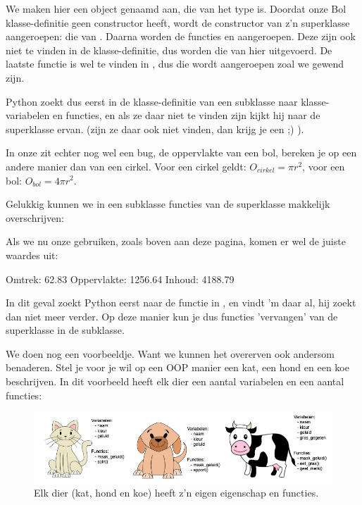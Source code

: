 We maken hier een object genaamd  aan, die van het type  is. Doordat onze Bol klasse-definitie geen constructor heeft, wordt de constructor van z'n superklasse aangeroepen: die van . Daarna worden de functies  en  aangeroepen. Deze zijn ook niet te vinden in de  klasse-definitie, dus worden die van  hier uitgevoerd. De laatste functie  is wel te vinden in , dus die wordt aangeroepen zoal we gewend zijn. \newline

Python zoekt dus eerst in de klasse-definitie van een subklasse naar klasse-variabelen en functies, en als ze daar niet te vinden zijn kijkt hij naar de superklasse ervan. (zijn ze daar ook niet vinden, dan krijg je een  ;) ). \newline

In onze  zit echter nog wel een bug, de oppervlakte van een bol, bereken je op een andere manier dan van een cirkel. Voor een cirkel geldt: $O_{cirkel} = \pi r^2$, voor een bol: $O_{bol} = 4\pi r^2$. \newline

Gelukkig kunnen we in een subklasse functies van de superklasse makkelijk overschrijven:

Als we nu onze  gebruiken, zoals boven aan deze pagina, komen er wel de juiste waardes uit:
\begin{python}
Omtrek: 62.83
Oppervlakte: 1256.64
Inhoud: 4188.79
\end{python}

In dit geval zoekt Python eerst naar de functie  in , en vindt 'm daar al, hij zoekt dan niet meer verder. Op deze manier kun je dus functies 'vervangen' van de superklasse in de subklasse. \newline \newline

We doen nog een voorbeeldje. Want we kunnen het overerven ook andersom benaderen. Stel je voor je wil op een OOP manier een kat, een hond en een koe beschrijven. In dit voorbeeld heeft elk dier een aantal variabelen en een aantal functies: 

\begin{figure}[h!]
\centering\includegraphics[scale=0.5]{Pictures/chapter08/animals.png}
  \caption{\small Elk dier (kat, hond en koe) heeft z'n eigen eigenschap en functies.} 
\label{fig:animals} %
\end{figure}

